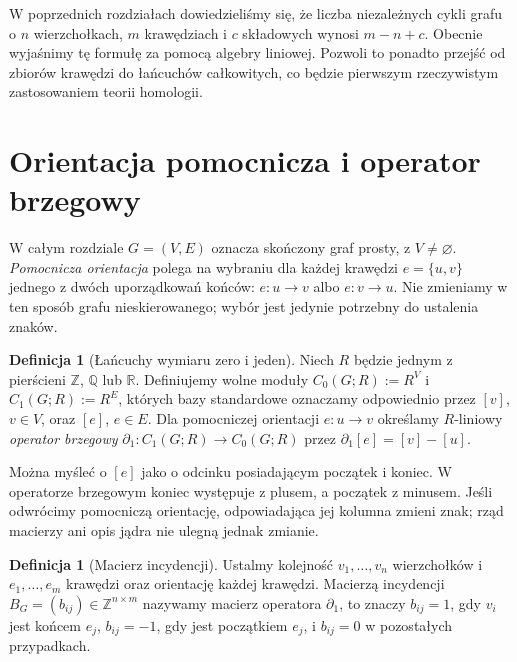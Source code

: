 \documentclass[11pt,a4paper]{report}
\numberwithin{equation}{section}
\theoremstyle{plain}
\theoremstyle{definition}
\newtheorem{definicja}[twierdzenie]{Definicja}
\theoremstyle{remark}
\begin{document}
W poprzednich rozdziałach dowiedzieliśmy się, że liczba niezależnych
cykli grafu o $n$ wierzchołkach, $m$ krawędziach i $c$ składowych wynosi
$m-n+c$. Obecnie wyjaśnimy tę formułę za pomocą algebry liniowej.
Pozwoli to ponadto przejść od zbiorów krawędzi do łańcuchów całkowitych,
co będzie pierwszym rzeczywistym zastosowaniem teorii homologii.

\section{Orientacja pomocnicza i operator brzegowy}
\label{sec:tg-boundary}

W całym rozdziale $G=(V,E)$ oznacza skończony graf prosty, z $V\ne\varnothing$.
\emph{Pomocnicza orientacja} polega na wybraniu dla każdej krawędzi
$e=\{u,v\}$ jednego z dwóch uporządkowań końców: $e:u\to v$ albo
$e:v\to u$. Nie zmieniamy w ten sposób grafu nieskierowanego;
wybór jest jedynie potrzebny do ustalenia znaków.

\begin{definicja}[Łańcuchy wymiaru zero i jeden]
Niech $R$ będzie jednym z pierścieni $\mathbb Z$, $\mathbb Q$ lub
$\mathbb R$. Definiujemy wolne moduły
$C_0(G;R):=R^V$ i $C_1(G;R):=R^E$, których bazy standardowe
oznaczamy odpowiednio przez $[v]$, $v\in V$, oraz $[e]$, $e\in E$.
Dla pomocniczej orientacji $e:u\to v$ określamy $R$-liniowy
\emph{operator brzegowy} $\partial_1:C_1(G;R)\to C_0(G;R)$ przez
$\partial_1[e]=[v]-[u]$.
\end{definicja}

Można myśleć o $[e]$ jako o odcinku posiadającym początek i koniec.
W operatorze brzegowym koniec występuje z plusem, a początek z minusem.
Jeśli odwrócimy pomocniczą orientację, odpowiadająca jej kolumna
zmieni znak; rząd macierzy ani opis jądra nie ulegną jednak zmianie.

\begin{definicja}[Macierz incydencji]
Ustalmy kolejność $v_1,\ldots,v_n$ wierzchołków i $e_1,\ldots,e_m$
krawędzi oraz orientację każdej krawędzi. Macierzą incydencji
$B_G=(b_{ij})\in\mathbb Z^{n\times m}$ nazywamy macierz operatora
$\partial_1$, to znaczy $b_{ij}=1$, gdy $v_i$ jest końcem $e_j$,
$b_{ij}=-1$, gdy jest początkiem $e_j$, i $b_{ij}=0$ w pozostałych
przypadkach.
\end{definicja}

\begin{center}
\end{center}
\end{document}
